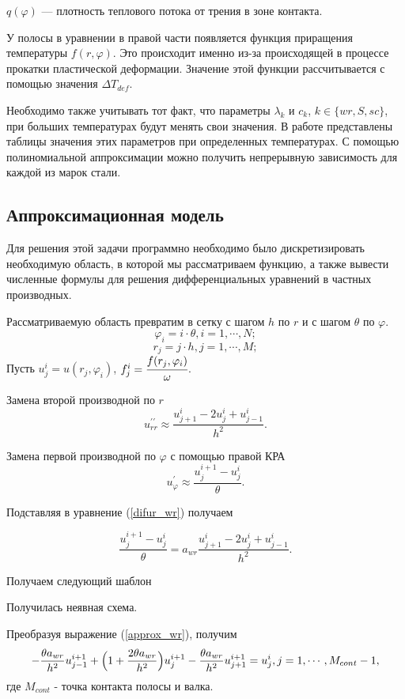 $q(\varphi)$ — плотность теплового потока от трения в зоне контакта.

У полосы в уравнении в правой части появляется функция приращения температуры $f(r, \varphi)$. Это происходит именно из-за происходящей в процессе прокатки пластической деформации. Значение этой функции рассчитывается с помощью значения $\Delta T_{def}$.

Необходимо также учитывать тот факт, что параметры $\lambda_k$ и $c_k$, $k \in \{wr, S, sc\}$, при больших температурах будут менять свои значения. В работе \cite{rachet_parametrov} представлены таблицы значения этих параметров при определенных температурах. С помощью полиномиальной аппроксимации можно получить непрерывную зависимость для каждой из марок стали.

\subsection{Аппроксимационная модель}

Для решения этой задачи программно необходимо было дискретизировать необходимую область, в которой мы рассматриваем функцию, а также вывести численные формулы для решения дифференциальных уравнений в частных производных.

Рассматриваемую область превратим в сетку с шагом $h$ по $r$ и с шагом $\theta$ по $\varphi$.
$$ \varphi_i = i \cdot \theta, i = 1, \cdots, N;$$
$$ r_j = j \cdot h, j = 1, \cdots, M; $$
Пусть $u^i_j = u(r_j, \varphi_i)$, $f^i_j = \cfrac{f(r_j, \varphi_i)}{\omega}$.

Замена второй производной по $r$
$$ u_{rr}^{\prime\prime} \approx \frac{u^i_{j+1} - 2u^i_{j} + u^i_{j-1}}{h^2}. $$

Замена первой производной по $\varphi$ с помощью правой КРА
$$ u_{\varphi}^\prime \approx \frac{u^{i+1}_{j} - u^i_{j}}{\theta}. $$

Подставляя в уравнение (\ref{difur_wr}) получаем

\begin{equation}
\frac{u^{i+1}_{j} - u^i_{j}}{\theta} = a_{wr}\frac{u^i_{j+1} - 2u^i_{j} + u^i_{j-1}}{h^2}.
\label{approx_wr}
\end{equation}

Получаем следующий шаблон

Получилась неявная схема.

Преобразуя выражение (\ref{approx_wr}), получим
\begin{equation}
-\frac{\theta a_{wr}}{h^2}u_{j-1}^{i+1} + \Bigl(1 + \frac{2\theta a_{wr}}{h^2}\Bigr)u_{j}^{i+1}-\frac{\theta a_{wr}}{h^2}u_{j+1}^{i+1} = u_{j}^{i}, j=1,\cdots,M_{cont}-1,
\label{schema_rw}
\end{equation}
где $M_{cont}$ - точка контакта полосы и валка.


